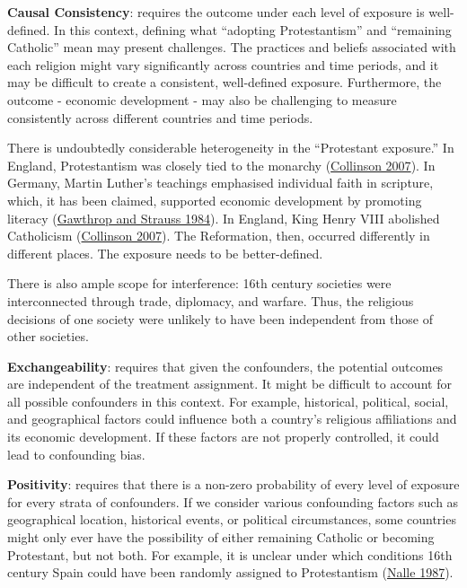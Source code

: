 \documentclass[
  singlecolumn]{article}
\begin{document}
\textbf{Causal Consistency}: requires the outcome under each level of
exposure is well-defined. In this context, defining what ``adopting
Protestantism'' and ``remaining Catholic'' mean may present challenges.
The practices and beliefs associated with each religion might vary
significantly across countries and time periods, and it may be difficult
to create a consistent, well-defined exposure. Furthermore, the outcome
- economic development - may also be challenging to measure consistently
across different countries and time periods.

There is undoubtedly considerable heterogeneity in the ``Protestant
exposure.'' In England, Protestantism was closely tied to the monarchy
(\protect\hyperlink{ref-collinson2007}{Collinson 2007}). In Germany,
Martin Luther's teachings emphasised individual faith in scripture,
which, it has been claimed, supported economic development by promoting
literacy (\protect\hyperlink{ref-gawthrop1984}{Gawthrop and Strauss
1984}). In England, King Henry VIII abolished Catholicism
(\protect\hyperlink{ref-collinson2007}{Collinson 2007}). The
Reformation, then, occurred differently in different places. The
exposure needs to be better-defined.

There is also ample scope for interference: 16th century societies were
interconnected through trade, diplomacy, and warfare. Thus, the
religious decisions of one society were unlikely to have been
independent from those of other societies.

\textbf{Exchangeability}: requires that given the confounders, the
potential outcomes are independent of the treatment assignment. It might
be difficult to account for all possible confounders in this context.
For example, historical, political, social, and geographical factors
could influence both a country's religious affiliations and its economic
development. If these factors are not properly controlled, it could lead
to confounding bias.

\textbf{Positivity}: requires that there is a non-zero probability of
every level of exposure for every strata of confounders. If we consider
various confounding factors such as geographical location, historical
events, or political circumstances, some countries might only ever have
the possibility of either remaining Catholic or becoming Protestant, but
not both. For example, it is unclear under which conditions 16th century
Spain could have been randomly assigned to Protestantism
(\protect\hyperlink{ref-nalle1987}{Nalle 1987}).
\end{document}
